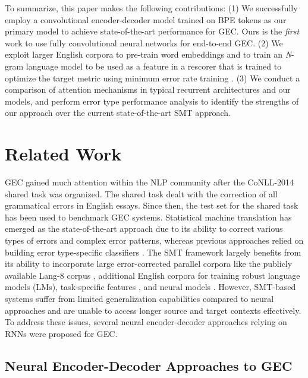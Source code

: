 \documentclass[letterpaper]{article}
\begin{document}
To summarize, this paper makes the following contributions: (1) We successfully employ a convolutional encoder-decoder model trained on BPE tokens as our primary model to achieve state-of-the-art performance for GEC. Ours is the \emph{first} work to use fully convolutional neural networks for end-to-end GEC. (2) We exploit larger English corpora to pre-train word embeddings and to train an \textit{N}-gram language model to be used as a feature in a rescorer that is trained to optimize the target metric using minimum error rate training \cite{och2003mert}. (3) We conduct a comparison of attention mechanisms in typical recurrent architectures and our models, and perform error type performance analysis to identify the strengths of our approach over the current state-of-the-art SMT approach.



\section{Related Work}

GEC gained much attention within the NLP community after the CoNLL-2014 shared task \cite{ng2014conll2014} was organized. The shared task dealt with the correction of all grammatical errors in English essays. Since then, the test set for the shared task has been used to benchmark GEC systems. Statistical machine translation has emerged as the state-of-the-art approach \cite{chollampatt2017connectingdots} due to its ability to correct various types of errors and complex error patterns, whereas previous approaches relied on building error type-specific classifiers \cite{dahlmeier-ng-ng:2012:BEA,rozovskaya2014illinois}. The SMT framework largely benefits from its ability to incorporate large error-corrected parallel corpora like the publicly available Lang-8 corpus \cite{mizumoto2011mining}, additional English corpora for training robust language models (LMs), task-specific features \cite{junczysdowmunt2016phrase}, and neural models \cite{chollampatt2016neural}. However, SMT-based systems suffer from limited generalization capabilities compared to neural approaches and are unable to access longer source and target contexts effectively. To address these issues, several neural encoder-decoder approaches relying on RNNs were proposed for GEC.

\subsection{Neural Encoder-Decoder Approaches to GEC}
\end{document}
